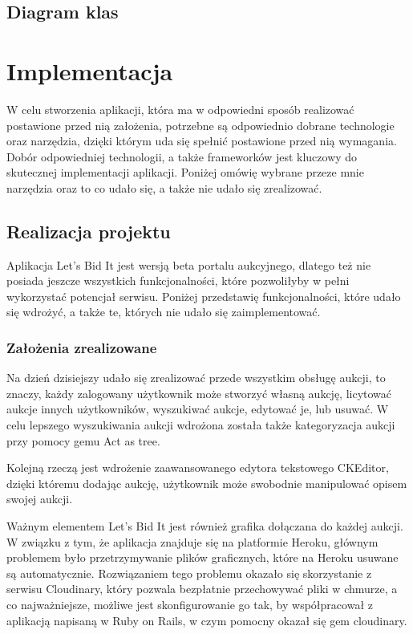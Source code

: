 \documentclass[brudnopis]{xmgr}
\begin{document}
\section{Diagram klas}

\chapter{Implementacja}
W celu stworzenia aplikacji, która ma w odpowiedni sposób realizować postawione przed nią
założenia, potrzebne są odpowiednio dobrane technologie oraz narzędzia, dzięki którym uda się 
spełnić postawione przed nią wymagania. Dobór odpowiedniej technologii, a także frameworków 
jest kluczowy do skutecznej implementacji aplikacji. Poniżej omówię wybrane przeze mnie narzędzia oraz to co udało się, a także nie udało się zrealizować.

\section{Realizacja projektu}

Aplikacja Let's Bid It jest wersją beta portalu aukcyjnego, dlatego też nie posiada jeszcze wszystkich funkcjonalności, które pozwoliłyby w pełni wykorzystać potencjał serwisu. Poniżej przedstawię funkcjonalności, które udało się wdrożyć, a także te, których nie udało się zaimplementować.

\subsection{Założenia zrealizowane}

Na dzień dzisiejszy udało się zrealizować przede wszystkim obsługę aukcji, to znaczy, każdy zalogowany użytkownik może stworzyć
własną aukcję, licytować aukcje innych użytkowników, wyszukiwać aukcje, edytować je, lub usuwać. W celu lepszego wyszukiwania aukcji wdrożona została także kategoryzacja aukcji przy pomocy gemu Act as tree.

Kolejną rzeczą jest wdrożenie zaawansowanego edytora tekstowego CKEditor, dzięki któremu dodając aukcję, użytkownik może swobodnie manipulować opisem swojej aukcji.

Ważnym elementem Let's Bid It jest również grafika dołączana do każdej aukcji. W związku z tym, że aplikacja znajduje się na platformie Heroku, głównym problemem było przetrzymywanie plików graficznych, które na Heroku usuwane są automatycznie. Rozwiązaniem tego problemu okazało się skorzystanie z serwisu Cloudinary, który pozwala bezpłatnie przechowywać pliki w chmurze, a co najważniejsze, możliwe jest skonfigurowanie go tak, by współpracował z aplikacją napisaną w Ruby on Rails, w czym pomocny okazał się gem cloudinary.
\end{document}
